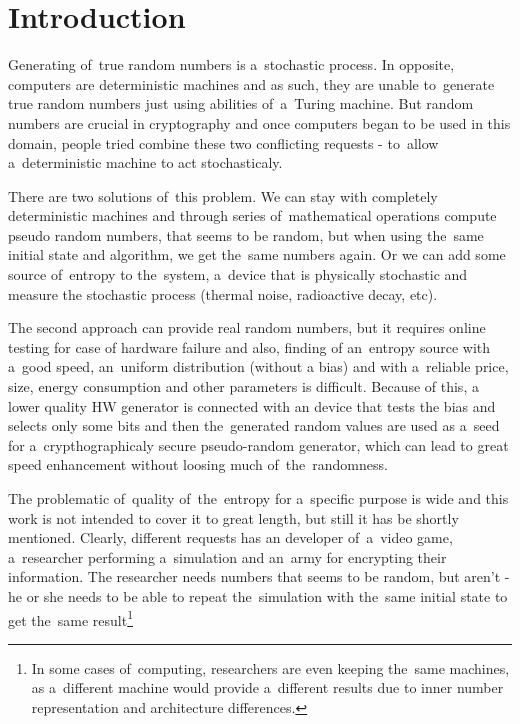 \chapter{Introduction}
Generating of~true random numbers is a~stochastic process.
In opposite, computers are deterministic machines and as such, 
they are unable to~generate true random numbers just using abilities of~a~Turing machine. 
But random numbers are crucial in cryptography and once computers began to be used in this domain,
people tried combine these two conflicting requests - to~allow a~deterministic machine to act stochasticaly. 

There are two solutions of~this problem. We can stay with completely deterministic machines and through series of~mathematical operations compute pseudo random numbers, that seems to be random, but when using the~same initial state and algorithm, we get the~same numbers again. Or we can add some source of~entropy to the~system, a~device that is physically stochastic and measure the stochastic process (thermal noise, radioactive decay, etc).

The second approach can provide real random numbers, but it requires online testing for case of hardware failure and also, finding of an~entropy source with a~good speed, an~uniform distribution (without a bias) and with a~reliable price, size, energy consumption and other parameters is difficult. Because of this, a lower quality HW generator is connected with an device that tests the bias and selects only some bits and then the~generated random values are used as a~seed for a~crypthographicaly secure pseudo-random generator, which can lead to great speed enhancement without loosing much of~the~randomness.

The problematic of~quality of~the~entropy for a~specific purpose is wide and this work is not intended to cover it to great length, but still it has be shortly mentioned. Clearly, different requests has an developer of~a~video game, a~researcher performing a~simulation and an~army for encrypting their information. The researcher needs numbers that seems to be random, but aren't - he or she needs to be able to repeat the~simulation with the~same initial state to get the~same result\footnote{In some cases of~computing, researchers are even keeping the~same machines, as a~different machine would provide a~different results due to inner number representation and architecture differences.\cite{ArithmeticInCloud}%
}

